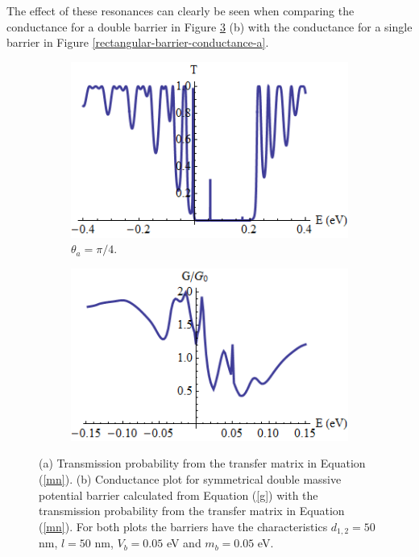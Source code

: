 				The effect of these resonances can clearly be seen when comparing the conductance for a double barrier in Figure \ref{doubletransmissionplotg} (b) with the conductance for a single barrier in Figure \ref{rectangular-barrier-conductance-a}.
\begin{figure}
	\begin{subfigure}{0.5\textwidth}
		\centerline{\includegraphics[scale=0.6]{images/double-potential-mass}}
		\caption{$\theta_{a}=\pi/4$.}
		\label{doubletransmissionplotga}
	\end{subfigure}
	\hspace{0.6cm}
	\begin{subfigure}{0.5\textwidth}
		\centerline{\includegraphics[scale=0.6]{images/double-potential-g}}
		\caption{}
		\label{doublegplot}
	\end{subfigure}
	\caption{(a) Transmission probability from the transfer matrix in Equation (\ref{mn}). (b) Conductance plot for symmetrical double massive potential barrier calculated from Equation (\ref{g}) with the transmission probability from the transfer matrix in Equation (\ref{mn}). For both plots the barriers have the characteristics $d_{1,2}=50$ nm, $l=50$ nm, $V_{b}=0.05$ eV and $m_{b}=0.05$ eV.}
	\label{doubletransmissionplotg}
\end{figure}
